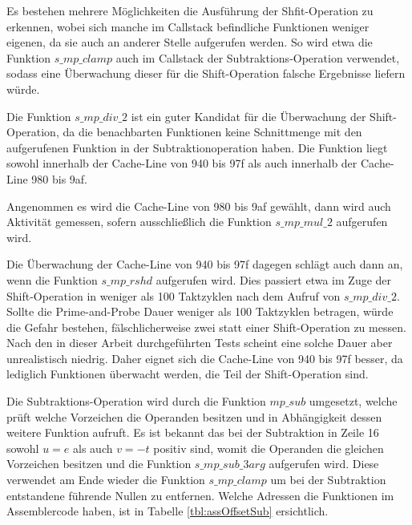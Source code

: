 Es bestehen mehrere Möglichkeiten die Ausführung der Shfit-Operation zu erkennen, wobei sich manche im Callstack befindliche Funktionen weniger eigenen, da sie auch an anderer Stelle aufgerufen werden.
So wird etwa die Funktion $s\_mp\_clamp$ auch im Callstack der Subtraktions-Operation verwendet, sodass eine Überwachung dieser für die Shift-Operation falsche Ergebnisse liefern würde.

Die Funktion $s\_mp\_div\_2$ ist ein guter Kandidat für die Überwachung der Shift-Operation, da die benachbarten Funktionen keine Schnittmenge mit den aufgerufenen Funktion in der Subtraktionoperation haben.
Die Funktion liegt sowohl innerhalb der Cache-Line von 940 bis 97f als auch innerhalb der Cache-Line 980 bis 9af.

Angenommen es wird die Cache-Line von 980 bis 9af gewählt, dann wird auch Aktivität gemessen, sofern ausschließlich die Funktion $s\_mp\_mul\_2$ aufgerufen wird.

Die Überwachung der Cache-Line von 940 bis 97f dagegen schlägt auch dann an, wenn die Funktion $s\_mp\_rshd$ aufgerufen wird.
Dies passiert etwa im Zuge der Shift-Operation in weniger als 100 Taktzyklen nach dem Aufruf von $s\_mp\_div\_2$.
Sollte die Prime-and-Probe Dauer weniger als 100 Taktzyklen betragen, würde die Gefahr bestehen, fälschlicherweise zwei statt einer Shift-Operation zu messen.
Nach den in dieser Arbeit durchgeführten Tests scheint eine solche Dauer aber unrealistisch niedrig.
Daher eignet sich die Cache-Line von 940 bis 97f besser, da lediglich Funktionen überwacht werden, die Teil der Shift-Operation sind.


Die Subtraktions-Operation wird durch die Funktion $mp\_sub$ umgesetzt, welche prüft welche Vorzeichen die Operanden besitzen und in Abhängigkeit dessen weitere Funktion aufruft.
Es ist bekannt das bei der Subtraktion in Zeile 16 sowohl $u=e$ als auch $v=-t$ positiv sind, womit die Operanden die gleichen Vorzeichen besitzen und die Funktion $s\_mp\_sub\_3arg$ aufgerufen wird.
Diese verwendet am Ende wieder die Funktion $s\_mp\_clamp$ um bei der Subtraktion entstandene führende Nullen zu entfernen.
Welche Adressen die Funktionen im Assemblercode haben, ist in Tabelle \ref{tbl:assOffsetSub} ersichtlich. 


